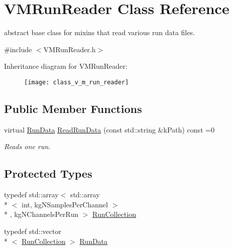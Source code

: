 \hypertarget{class_v_m_run_reader}{\section{V\+M\+Run\+Reader Class Reference}
\label{class_v_m_run_reader}
}


abstract base class for mixins that read various run data files.  




{\ttfamily \#include $<$V\+M\+Run\+Reader.\+h$>$}

Inheritance diagram for V\+M\+Run\+Reader\+:\begin{figure}[H]
\begin{center}
\leavevmode
\texttt{[image: class\_v\_m\_run\_reader]}
\end{center}
\end{figure}
\subsection*{Public Member Functions}
\begin{DoxyCompactItemize}
\item 
virtual \hyperlink{class_v_m_run_reader_aa84c99e50235a10f563b3487b3930602}{Run\+Data} \hyperlink{class_v_m_run_reader_afe0f812890dcb11638a66c878f0d8765}{Read\+Run\+Data} (const std\+::string \&k\+Path) const =0
\begin{DoxyCompactList}\small\item\em Reads one run. \end{DoxyCompactList}\end{DoxyCompactItemize}
\subsection*{Protected Types}
\begin{DoxyCompactItemize}
\item 
typedef std\+::array$<$ std\+::array\\*
$<$ int, kg\+N\+Samples\+Per\+Channel $>$\\*
, kg\+N\+Channels\+Per\+Run $>$ \hyperlink{class_v_m_run_reader_aca02fe95a36b6651ad0cf4bc7a8d02e4}{Run\+Collection}
\item 
typedef std\+::vector\\*
$<$ \hyperlink{class_v_m_run_reader_aca02fe95a36b6651ad0cf4bc7a8d02e4}{Run\+Collection} $>$ \hyperlink{class_v_m_run_reader_aa84c99e50235a10f563b3487b3930602}{Run\+Data}
\end{DoxyCompactItemize}
